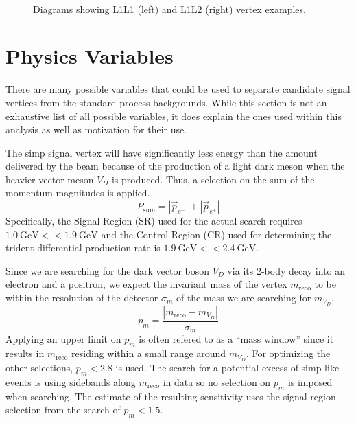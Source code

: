 \begin{figure}
  \centering
  \begin{subfigure}{0.48\textwidth}
    \centering
    \resizebox{\textwidth}{!}{}
  \end{subfigure}
  ~
  \begin{subfigure}{0.48\textwidth}
    \centering
    \resizebox{\textwidth}{!}{}
  \end{subfigure}
  \caption{Diagrams showing L1L1 (left) and L1L2 (right) vertex examples.}
  \label{fig:hps-reco-category-diagram}
\end{figure}

\section{Physics Variables}
\label{sec:hps:analysis:variables}
There are many possible variables that could be used to separate candidate signal
vertices from the standard process backgrounds.
While this section is not an exhaustive list of all possible variables,
it does explain the ones used within this analysis as well as motivation for
their use.

The \ac{simp} signal vertex will have significantly less energy than the amount
delivered by the beam because of the production of a light dark meson when the heavier
vector meson $V_D$ is produced.
Thus, a selection on the sum of the momentum magnitudes is applied.
\begin{equation}
  P_\mathrm{sum} = |\vec{p}_{e^-}|+|\vec{p}_{e^+}|
\end{equation}
Specifically, the Signal Region (SR) used for the actual search requires
$\qty{1.0}{\GeV} < $\Psum$ < \qty{1.9}{\GeV}$ and the Control Region (CR)
used for determining the trident differential production rate is
$\qty{1.9}{\GeV} < $\Psum$ < \qty{2.4}{\GeV}$.

Since we are searching for the dark vector boson $V_D$ via its
2-body decay into an electron and a positron, we expect the invariant mass of the vertex $m_\text{reco}$
to be within the resolution of the detector $\sigma_m$ of the mass we are searching for $m_{V_D}$.
\begin{equation}
  p_m = \frac{|m_\text{reco}-m_{V_D}|}{\sigma_m}
\end{equation}
Applying an upper limit on $p_m$ is often refered to as a ``mass window''
since it results in $m_\text{reco}$ residing within a small range around $m_{V_D}$.
For optimizing the other selections, $p_m < 2.8$ is used.
The search for a potential excess of \ac{simp}-like events is using sidebands
along $m_\mathrm{reco}$ in data so no selection on $p_m$ is imposed when searching.
The estimate of the resulting sensitivity uses the signal region selection from
the search of $p_m < 1.5$.

